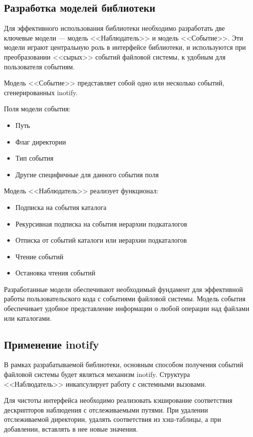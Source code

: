 \documentclass[14pt, russian]{scrartcl}
\begin{document}
\subsection{Разработка моделей библиотеки}

Для эффективного использования библиотеки необходимо разработать две ключевые
модели --- модель <<Наблюдатель>> и модель <<Событие>>. Эти модели играют
центральную роль в интерфейсе библиотеки, и используются при преобразовании
<<сырых>> событий файловой системы, к удобным для пользователя событиям.

Модель <<Событие>> представляет собой одно или несколько событий,
сгенерированных inotify.

Поля модели события:

\begin{itemize}
	\item Путь
	\item Флаг директории
  \item Тип события
  \item Другие специфичные для данного события поля
\end{itemize}

Модель <<Наблюдатель>> реализует функционал:

\begin{itemize}
  \item Подписка на события каталога
  \item Рекурсивная подписка на события иерархии подкаталогов
  \item Отписка от событий каталоги или иерархии подкаталогов
  \item Чтение событий
  \item Остановка чтения событий
\end{itemize}

Разработанные модели обеспечивают необходимый фундамент для эффективной работы
пользовательского кода с событиями файловой системы. Модель события обеспечивает
удобное представление информации о любой операции над файлами или каталогами.

\subsection{Применение inotify}

В рамках разрабатываемой библиотеки, основным способом получения событий
файловой системы будет являться механизм inotify. Структура <<Наблюдатель>>
инкапсулирует работу с системными вызовами.

Для чистоты интерфейса необходимо реализовать кэширование соответствия
дескрипторов наблюдения с отслеживаемыми путями. При удалении отслеживаемой
директории, удалять соответствия из хэш-таблицы, а при добавлении, вставлять в
нее новые значения.
\end{document}
